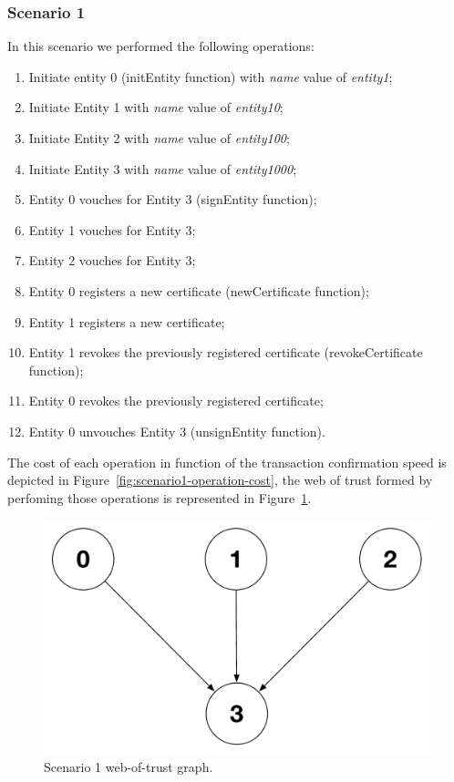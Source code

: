 \subsubsection{Scenario 1}

In this scenario we performed the following operations:

\begin{enumerate}[label=\alph*.]
  \item Initiate entity 0 (initEntity function) with \textit{name} value of \textit{entity1};
  \item Initiate Entity 1 with \textit{name} value of \textit{entity10};
  \item Initiate Entity 2 with \textit{name} value of \textit{entity100};
  \item Initiate Entity 3 with \textit{name} value of \textit{entity1000};
  \item Entity 0 vouches for Entity 3 (signEntity function);
  \item Entity 1 vouches for Entity 3;
  \item Entity 2 vouches for Entity 3;
  \item Entity 0 registers a new certificate (newCertificate function);
  \item Entity 1 registers a new certificate;
  \item Entity 1 revokes the previously registered certificate (revokeCertificate function);
  \item Entity 0 revokes the previously registered certificate;
  \item Entity 0 unvouches Entity 3 (unsignEntity function).
\end{enumerate}

The cost of each operation in function of the transaction confirmation speed is depicted in Figure~\ref{fig:scenario1-operation-cost}, the web of trust formed by perfoming those operations is represented in Figure~\ref{fig:scenario1-wot-graph}.

\begin{figure}[htb]
  \centering
  \includegraphics[scale=0.5]{Figures/evaluation/wot-scenario1-graph.pdf}
  \caption{Scenario 1 web-of-trust graph.}
\label{fig:scenario1-wot-graph}
\end{figure}

